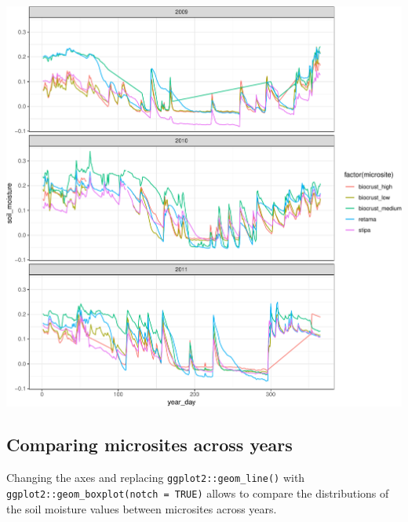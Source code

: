 \documentclass[]{article}
\begin{document}
\includegraphics{moiscrust_files/figure-latex/unnamed-chunk-37-1.pdf}

\hypertarget{comparing-microsites-across-years}{%
\subsection{Comparing microsites across
years}\label{comparing-microsites-across-years}}

Changing the axes and replacing \texttt{ggplot2::geom\_line()} with
\texttt{ggplot2::geom\_boxplot(notch\ =\ TRUE)} allows to compare the
distributions of the soil moisture values between microsites across
years.
\end{document}
